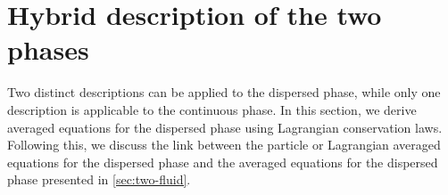 \section{Hybrid description of the two phases}
\label{sec:averaged_eq}

Two distinct descriptions can be applied to the dispersed phase, while only one description is applicable to the continuous phase. 
In this section, we derive averaged equations for the dispersed phase using Lagrangian conservation laws. 
Following this, we  discuss the link between the particle or Lagrangian averaged equations for the dispersed phase and the averaged equations for the dispersed phase presented in \ref{sec:two-fluid}.




 



